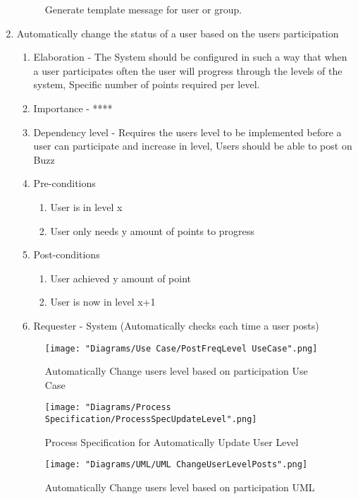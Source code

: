 \documentclass[12pt]{article}
\begin{document}
\begin{enumerate}
\begin{figure}[h]
    	\caption{Generate template message for user or group.}
    \end{figure}
\clearpage %
   \item Automatically change the status of a user based on the users participation %
  \begin{enumerate}
    \item Elaboration - The System should be configured in such a way that when a user participates often the user will progress through the levels of the system, Specific number of points required per level.
    \item Importance - ****
    \item Dependency level - Requires the users level to be implemented before a user can participate and increase in level, Users should be able to post on Buzz
    \item Pre-conditions
    \begin{enumerate}
    	\item User is in level x
    	\item User only needs y amount of points to progress
    \end{enumerate}
        \item Post-conditions
    \begin{enumerate}
    	\item User achieved y amount of point
    	\item User is now in level x+1
    \end{enumerate}
    \item Requester - System (Automatically checks each time a user posts)
  \end{enumerate}
\begin{figure}[h]
	\centering
	\texttt{[image: "Diagrams/Use Case/PostFreqLevel UseCase".png]}
	\caption{Automatically Change users level based on participation Use Case}
\end{figure}
\begin{figure}[h]
	\centering
	\texttt{[image: "Diagrams/Process Specification/ProcessSpecUpdateLevel".png]}
	\caption{Process Specification for Automatically Update User Level}
\end{figure} 
\begin{figure}[h]
	\centering
	\texttt{[image: "Diagrams/UML/UML ChangeUserLevelPosts".png]}
	\caption{Automatically Change users level based on participation UML}
\end{figure}
\clearpage %


\end{enumerate}
\end{document}
